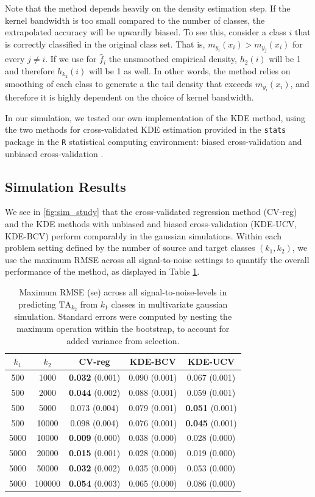 \documentclass[twoside,11pt]{article}
\begin{document}
Note that the method depends heavily on the density estimation
step. If the kernel bandwidth is too small compared to the number of
classes, the extrapolated accuracy will be upwardly biased.  To see
this, consider a class $i$ that is correctly classified in the
original class set. That is, $m_{y_i}(x_i)>m_{y_j}(x_i)$ for every
$j\neq i$. If we use for $\hat{f}_i$ the unsmoothed empirical density,
$h_2(i)$ will be 1 and therefore $h_{k_2}(i)$ will be 1 as well. In
other words, the method relies on smoothing of each class to generate
a the tail density that exceeds $m_{y_i}(x_i)$, and therefore it is
highly dependent on the choice of kernel bandwidth.

In our simulation, we tested our own implementation of the KDE method,
using the two methods for cross-validated KDE estimation provided in
the {\tt stats} package in the {\tt R} statistical computing
environment: biased cross-validation and unbiased cross-validation \citep{Scott1992}.


\subsection*{Simulation Results}

We see in \ref{fig:sim_study} that the cross-validated regression
method (CV-reg) and the KDE methods with unbiased and biased
cross-validation (KDE-UCV, KDE-BCV) perform comparably in the gaussian
simulations.  Within each problem setting defined by the number of
source and target classes $(k_1,k_2)$, we use the maximum RMSE across
all signal-to-noise settings to quantify the overall performance of
the method, as displayed in Table \ref{tab:sim_max_error}.

\begin{table}
\centering
\begin{tabular}{cc||c|c|c}
\hline
$k_1$ & $k_2$ & CV-reg & KDE-BCV & KDE-UCV \\\hline 
500 & 1000 & \textbf{0.032} (0.001) & 0.090 (0.001) & 0.067 (0.001) \\
500 & 2000 & \textbf{0.044} (0.002) & 0.088 (0.001) & 0.059 (0.001) \\
500 & 5000 & 0.073 (0.004) & 0.079 (0.001) & \textbf{0.051} (0.001) \\
500 &10000 & 0.098 (0.004) & 0.076 (0.001) & \textbf{0.045} (0.001) \\\hline
5000 & 10000 & \textbf{0.009} (0.000) & 0.038 (0.000) & 0.028 (0.000) \\
5000 & 20000 & \textbf{0.015} (0.001) & 0.028 (0.000) & 0.019 (0.000) \\
5000 & 50000 & \textbf{0.032} (0.002) & 0.035 (0.000) & 0.053 (0.000) \\
5000 &100000 & \textbf{0.054} (0.003) & 0.065 (0.000) & 0.086 (0.000) \\\hline
\end{tabular}
\caption{Maximum RMSE (se) across all signal-to-noise-levels in
  predicting $\text{TA}_{k_2}$ from $k_1$ classes in multivariate
  gaussian simulation.  Standard errors were computed by nesting the
  maximum operation within the bootstrap, to account for added
  variance from selection.}\label{tab:sim_max_error}
\end{table}
\end{document}
